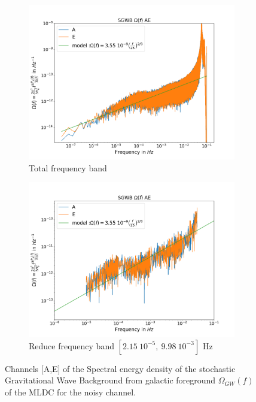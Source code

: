 \documentclass[a4paper,12pt]{article}
\begin{document}
\begin{figure}[H]
\begin{subfigure}{.5\textwidth}
  \centering
  \includegraphics[width=1.\linewidth]{Omega_AE}
  \caption{Total frequency band }
  
\end{subfigure}%
\begin{subfigure}{.5\textwidth}
  \centering
  \includegraphics[width=1.\linewidth]{Omega_AET}
  \caption{Reduce frequency band $[2.15 \ 10^{-5}, \   9.98 \ 10^{-3}] \text{ Hz}$}
\end{subfigure}
\caption{Channels [A,E] of the Spectral energy density of the stochastic Gravitational Wave Background from galactic foreground $\Omega_{GW}(f)$ of the MLDC for the noisy channel.}
\label{fig:Omeganoisely}
\end{figure}
\end{document}
